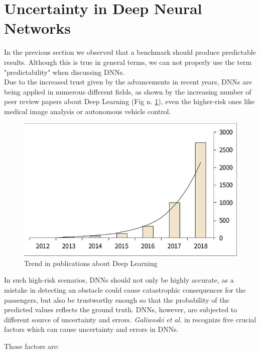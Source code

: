 \section{Uncertainty in Deep Neural Networks}
In the previous section we observed that a benchmark should produce predictable results. Although this is true in general terms, we can not properly use the term "predictability" when discussing DNNs. \\
Due to the increased trust given by the advancements in recent years, DNNs are being applied in numerous different fields, as shown by the increasing number of peer review papers about Deep Learning (Fig n. \ref{fig:annual_trend}), even the higher-risk ones 
like medical image analysis or autonomous vehicle control. \cite{gawlikowski2021survey}
\begin{figure}[h]
    \centering
    \includegraphics{img/Annual-trend-in-the-number-of-papers-related-to-deep-learning-in-the-medical-field_W640.jpg}
    \caption[Trend in publications about Deep Learning]{Trend in publications about Deep Learning  \cite{Number_of_DL_papers}}
    \label{fig:annual_trend}
\end{figure}


In such high-risk scenarios, DNNs should not only be highly accurate, as a mistake in detecting an obstacle could cause catastrophic consequences for the passengers, but also be trustworthy enough so that the probability of the predicted values reflects the ground truth. DNNs, however, are subjected to different source of uncertainty and errors. \textit{Galiwoski et al.} in \cite{gawlikowski2021survey} recognize five crucial factors which can cause uncertainty and errors in DNNs.\\\hfill

Those factors are:

